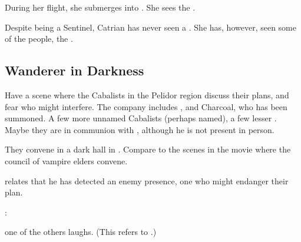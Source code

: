 During her flight, she submerges into \Nyx. She sees the . 

Despite being a Sentinel, Catrian has never seen a \dragon. She has, however, seen some of the \draconian{} people, the \rachyth. 







\subsection{Wanderer in Darkness}
Have a scene where the Cabalists in the Pelidor region discuss their plans, and fear who might interfere. The company includes \Teshrial, \Achsah{} and Charcoal, who has been summoned. A few more unnamed Cabalists (perhaps named), a few lesser \banes{}. Maybe they are in communion with \Azraid{}, although he is not present in person. 

They convene in a dark hall in \Nyx. Compare to the scenes in the movie \cite{Movie:Blade} where the council of vampire elders convene. 


\Teshrial{} relates that he has detected an enemy presence, one who might endanger their plan. 


\Teshrial: 

 one of the others laughs.  (This refers to \Secherdamon.)

